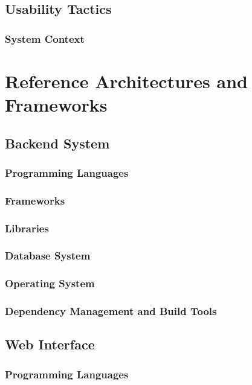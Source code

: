 \documentclass[11pt,fleqn]{book} %
\begin{document}
\section{Usability Tactics}
		\subsection{System Context}
	


\chapter{Reference Architectures and Frameworks}
	
	\section{Backend System}
		\subsection{Programming Languages}
		\subsection{Frameworks}
		\subsection{Libraries}
		\subsection{Database System}
		\subsection{Operating System}
		\subsection{Dependency Management and Build Tools}
	\section{Web Interface}
		\subsection{Programming Languages}
\end{document}
